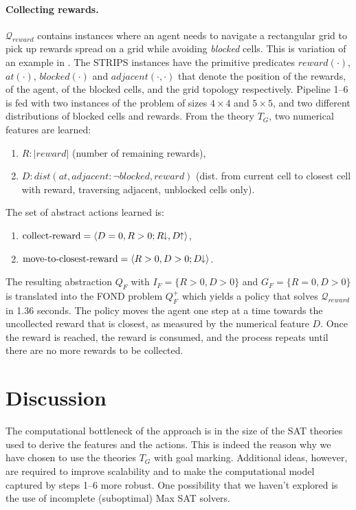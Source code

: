 \documentclass[letterpaper]{article} %
\newcommand{\tup}[1]{\langle #1 \rangle}
\newcommand{\abs}[1]{\ensuremath{\left\vert{#1}\right\vert}}
\newcommand{\Q}{\mathcal{Q}}
\newcommand{\abst}[2]{\tup{#1;#2}}
\newcommand{\pplus}{\hspace{-.05em}\raisebox{.15ex}{\footnotesize$\uparrow$}}
\newcommand{\mminus}{\hspace{-.05em}\raisebox{.15ex}{\footnotesize$\downarrow$}}
\begin{document}
\paragraph{Collecting rewards.}
$\Q_{reward}$ contains instances where  an agent needs to navigate a rectangular
grid to pick up  rewards spread on a grid  while 
avoiding \emph{blocked} cells. This is  variation of an
example  in \cite{garnelo2016towards}. The STRIPS instances have the primitive predicates $reward(\cdot)$, $at(\cdot)$, $blocked(\cdot)$
and $adjacent(\cdot,\cdot)$ that denote the position of the rewards, of
the agent, of the blocked cells, and the grid topology respectively.
Pipeline 1--6  is fed with two instances of the problem of sizes $4 \times 4$
and $5\times 5$, and two different  distributions of blocked cells  and rewards.
From the theory $T_G$, two numerical  features are learned:
\begin{enumerate}[--]
  \item $R: \abs{reward}$ (number of remaining rewards), 
  \item $D: dist(at, adjacent{:}\neg blocked, reward)$ (dist. from current
    cell to closest cell with reward, traversing adjacent, unblocked cells only).
\end{enumerate}
The set of  abstract actions  learned is:
\begin{enumerate}[--]
  \item $\text{collect-reward} = \abst{D=0, R > 0}{R\mminus, D\pplus}$,
  \item $\text{move-to-closest-reward} = \abst{R>0, D>0}{D\mminus}$.
\end{enumerate}

The resulting  abstraction $Q_F$ with $I_F = \{ R>0, D>0 \}$ and $G_F=\{R=0,D>0\}$
is translated into the  FOND problem $Q^+_F$ which yields
a policy  that solves $\Q_{reward}$ in 1.36 seconds. The policy moves the agent
one step at a time towards  the uncollected  reward that is closest, as measured by the
numerical feature $D$. Once the reward is reached, the reward is consumed, and
the process repeats until there are no more rewards to be collected. 


\section{Discussion}

The computational  bottleneck of the approach
is  in the size of the SAT  theories used to derive the features
and the actions.
This is indeed the reason why we have chosen to use the theories $T_G$
with goal marking. Additional ideas, however, are required
to improve scalability and to make the computational model
captured by  steps 1--6 more robust. One possibility that we haven't explored
is the use of incomplete (suboptimal) Max SAT solvers. 
\end{document}
